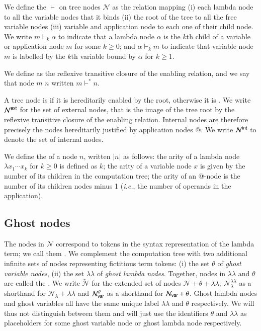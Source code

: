 \documentclass{elsarticle}
\makeatletter
\theoremstyle{plain}
\theoremstyle{definition}
\theoremstyle{remark}
\newcommand\Nodes{\mathcal{N}}%
\newcommand\NodesVar{\Nodes_{\sf var}}%
\newcommand\NodesLmd{\Nodes_\lambda}%
\newcommand\ExtendedNodes{\tilde{\Nodes}}
\newcommand{\ghostlmd}{{\lambda\!\!\lambda}}
\newcommand{\ghostvar}{\theta}
\newcommand\ImNodesVar{\NodesVar^\ghostvar}
\newcommand\ImNodesLmd{\NodesLmd^\ghostlmd}
\newcommand{\enables}{\vdash} %
\newcommand{\ExtNodes}{\Nodes^{\sf ext}}
\newcommand{\IntNodes}{\Nodes^{\sf int}}
\renewcommand\ie{{\it i.e.\@\xspace}}
\makeatother
\begin{document}
We define the  $\enables$ on tree nodes $\Nodes$ as the relation mapping (i) each lambda node to all the variable nodes that it binds (ii) the root of the tree to all the free variable nodes (iii) variable and application node to each one of their child node. We write $m \enables_k \alpha$ to indicate that a lambda node $\alpha$ is the $k$th child of a variable or application node $m$ for some $k\geq0$; and $\alpha \enables_k m$ to indicate that variable node $m$ is labelled by the $k$th variable bound by $\alpha$ for $k\geq1$.

We define  as the reflexive transitive closure of the enabling relation, and we say that node $m$  $n$ written $m \enables^* n$.

A tree node is  if it is hereditarily enabled by the root, otherwise it is . We write $\ExtNodes$ for the set of external nodes, that is the image of the tree root by the reflexive transitive closure of the enabling relation. Internal nodes are therefore precisely the nodes hereditarily justified by application nodes $@$. We write $\IntNodes$ to denote the set of internal nodes.

We define the  of a node $n$, written $|n|$ as follows: the arity of a lambda node $\lambda x_1 \cdots x_k$ for $k\geq 0$ is defined as $k$; the arity of a variable node $x$ is given by the number of its children in the computation tree; the arity of an $@$-node is the number of its children nodes minus 1 (\ie, the number of operands in the application).

\subsection{Ghost nodes}
The nodes in $\Nodes$ correspond to tokens in the syntax representation of the lambda term; we call them . We complement the computation tree with two additional infinite sets of nodes representing fictitious term tokens:
(i) the set $\ghostvar$ of \emph{ghost variable nodes}, (ii) the set $\ghostlmd$ of \emph{ghost lambda nodes}. Together, nodes in $\ghostlmd$ and $\ghostvar$ are called the . We write $\ExtendedNodes$ for the extended set of nodes $\Nodes + \ghostvar + \ghostlmd$; $\ImNodesLmd$ as a shorthand for $\NodesLmd + \ghostlmd$ and $\ImNodesVar$ as a shorthand for $\NodesVar + \ghostvar$. Ghost lambda nodes and ghost variables all have the same unique label $\ghostlmd$ and $\ghostvar$ respectively. We will thus not distinguish between them and will just use the identifiers $\ghostvar$ and $\ghostlmd$ as placeholders for some ghost variable node or ghost lambda node respectively.
\end{document}

